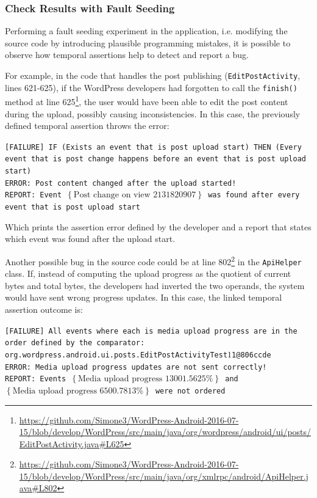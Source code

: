 \documentclass[11pt,a4paper,notitlepage]{article}
\begin{document}
\subsubsection{Check Results with Fault Seeding}
Performing a fault seeding experiment in the application, i.e. modifying the source code by introducing plausible programming mistakes, it is possible to observe how temporal assertions help to detect and report a bug.

For example, in the code that handles the post publishing (\texttt{EditPostActivity}, lines 621-625), if the WordPress developers had forgotten to call the \texttt{finish()} method at line 625\footnote{\url{https://github.com/Simone3/WordPress-Android-2016-07-15/blob/develop/WordPress/src/main/java/org/wordpress/android/ui/posts/EditPostActivity.java\#L625}}, the user would have been able to edit the post content during the upload, possibly causing inconsistencies. In this case, the previously defined temporal assertion throws the error:

\texttt{[FAILURE] IF (Exists an event that is post upload start) THEN (Every event that is post change happens before an event that is post upload start)\\
	ERROR: Post content changed after the upload started!\\
	REPORT: Event $\left\{\text{Post change on view 2131820907}\right\}$ was found after every event that is post upload start}
	
Which prints the assertion error defined by the developer and a report that states which event was found after the upload start.


Another possible bug in the source code could be at line 802\footnote{\url{https://github.com/Simone3/WordPress-Android-2016-07-15/blob/develop/WordPress/src/main/java/org/xmlrpc/android/ApiHelper.java\#L802}} in the \texttt{ApiHelper} class. If, instead of computing the upload progress as the quotient of current bytes and total bytes, the developers had inverted the two operands, the system would have sent wrong progress updates. In this case, the linked temporal assertion outcome is:

\texttt{[FAILURE] All events where each is media upload progress are in the order defined by the comparator: org.wordpress.android.ui.posts.EditPostActivityTest$1$1@806ccde\\
	ERROR: Media upload progress updates are not sent correctly!\\
	REPORT: Events $\left\{\text{Media upload progress 13001.5625\%}\right\}$ and $\left\{\text{Media upload progress 6500.7813\%}\right\}$ were not ordered}
	
\end{document}
